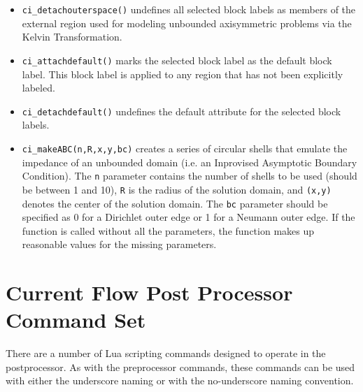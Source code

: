 \begin{itemize}
\item{\tt ci\_detachouterspace()} undefines all selected block labels
as members of the external region used for modeling unbounded axisymmetric
problems via the Kelvin Transformation.

\item{\tt ci\_attachdefault()} marks the
selected block label as the default block label.  This block label
is applied to any region that has not been explicitly labeled.

\item{\tt ci\_detachdefault()} undefines the default
attribute for the selected block labels.

\item{\tt ci\_makeABC(n,R,x,y,bc)} creates a series of circular shells that emulate the
impedance of an unbounded domain (i.e. an Inprovised Asymptotic Boundary
Condition).  The {\tt n} parameter contains the number of shells to be used
(should be between 1 and 10), {\tt R} is the radius of the solution domain, and
{\tt (x,y)} denotes the center of the solution domain.  The {\tt bc} parameter should
be specified as 0 for a Dirichlet outer edge or 1 for a Neumann outer edge.
If the function is called without all the parameters, the function makes up
reasonable values for the missing parameters.

\end{itemize}

\section{Current Flow Post Processor Command Set}

There are a number of Lua scripting commands designed to operate in
the postprocessor. As with the preprocessor commands, these
commands can be used with either the underscore naming or with the
no-underscore naming convention.

